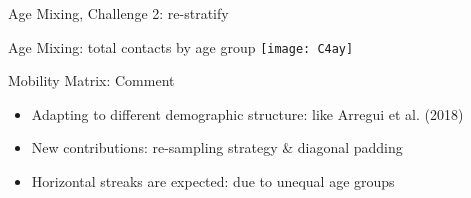 \begin{frame}{Age Mixing, Challenge 2: re-stratify}
  \centering
\end{frame}
\begin{frame}{Age Mixing: total contacts by age group}
  \centering\texttt{[image: C4ay]}
\end{frame}
\begin{frame}{Mobility Matrix: Comment}
  \begin{itemize}
    \item Adapting to different demographic structure: like Arregui et al. (2018)\smallpar
    \item New contributions: re-sampling strategy \& diagonal padding\smallpar
    \item Horizontal streaks are expected: due to unequal age groups
  \end{itemize}
\end{frame}
